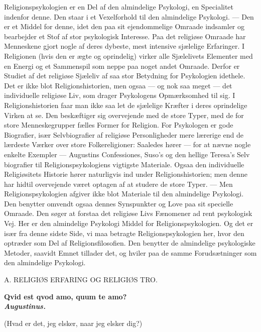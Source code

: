 \documentclass[12pt,a4paper,openany]{book}
\newcommand{\opage}[1]{\marginnote{\footnotesize\textit{[#1]}}}
\begin{document}
Religionspsykologien er en Del af den almindelige Psykologi, en
Specialitet indenfor denne. Den staar i et Vexelforhold til den
almindelige Psykologi. --- Den er et Middel for denne, idet den paa sit
ejendommelige Omraade indsamler og bearbejder et Stof af stor
psykologisk Interesse. Paa det religiøse Omraade har Menneskene gjort
nogle af deres dybeste, mest intensive sjælelige Erfaringer. I
Religionen (hvis den er ægte og oprindelig) virker alle Sjælelivets
Elementer med en Energi og et Sammenspil som neppe paa noget andet
Omraade. Derfor er Studiet af det religiøse Sjæleliv af saa stor
Betydning for Psykologien idethele. Det er ikke blot Religionshistorien,
men ogsaa --- og nok saa meget --- det individuelle religiøse Liv, som
drager Psykologens Opmærksomhed til sig. I Religionshistorien faar man
ikke saa let de sjælelige Kræfter i deres oprindelige Virken at se. Den
beskæftiger sig overvejende med de store Typer, med de for store
Menneskegrupper fælles Former for Religion. For Psykologen er gode
Biografier, især Selvbiografier af religiøse Personligheder mere
lærerige end de lærdeste Værker over store Folkereligioner: Saaledes
hører --- for at nævne nogle enkelte Exempler --- Augustins
Confessiones, Suso’s og den hellige Teresa’s Selv%
\opage{54}biografier til Religionspsykologiens vigtigste Materiale.
Ogsaa den individuelle Religiøsitets Historie hører naturligvis ind
under Religionshistorien; men denne har hidtil overvejende været optagen
af at studere de store Typer. --- Men Religionspsykologien afgiver ikke
blot Materiale til den almindelige Psykologi. Den benytter omvendt ogsaa
dennes Synspunkter og Love paa sit specielle Omraade. Den søger at
forstaa det religiøse Livs Fænomener ad rent psykologisk Vej. Her er den
almindelige Psykologi Middel for Religionspsykologien. Og det er især
fra denne sidste Side, vi maa betragte Religionspsykologien her, hvor
den optræder som Del af Religionsfilosofien. Den benytter de almindelige
psykologiske Metoder, saavidt Emnet tillader det, og hviler paa de samme
Forudsætninger som den almindelige Psykologi.

\clearpage

\opage{55}\begin{center}A. RELIGIØS ERFARING OG RELIGIØS TRO.\end{center}

\begin{flushright}\begin{minipage}{0.55\textwidth}\small\bfseries
Qvid est qvod amo, quum te amo?\\
\hfill\textit{Augustinus.}\par\smallskip
(Hvad er det, jeg elsker, naar jeg elsker dig?)
\end{minipage}\end{flushright}
\end{document}
